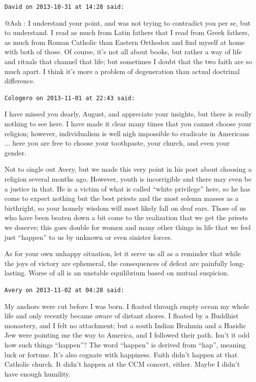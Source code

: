 \begin{footnotesize}
\begin{sffamily}
\hfill

\texttt{David on 2013-10-31 at 14:28 said:}

@Ash : I understand your point, and was not trying to contradict you per se, but to understand. I read as much from Latin fathers that I read from Greek fathers, as much from Roman Catholic than Eastern Orthodox and find myself at home with both of those. Of course, it's not all about books, but rather a way of life and rituals that channel that life; but sometimes I doubt that the two faith are so much apart. I think it's more a problem of degeneration than actual doctrinal difference.

\hfill

\texttt{Cologero on 2013-11-01 at 22:43 said:}

I have missed you dearly, August, and appreciate your insights, but there is really nothing to see here. I have made it clear many times that you cannot choose your religion; however, individualism is well nigh impossible to eradicate in Americans ... here you are free to choose your toothpaste, your church, and even your gender.

Not to single out Avery, but we made this very point in his post about choosing a religion several months ago. However, youth is incorrigible and there may even be a justice in that. He is a victim of what is called ``white privilege'' here, so he has come to expect nothing but the best priests and the most solemn masses as a birthright, so your homely wisdom will most likely fall on deaf ears. Those of us who have been beaten down a bit come to the realization that we get the priests we deserve; this goes double for women and many other things in life that we feel just ``happen'' to us by unknown or even sinister forces.

As for your own unhappy situation, let it serve us all as a reminder that while the joys of victory are ephemeral, the consequences of defeat are painfully long-lasting. Worse of all is an unstable equilibrium based on mutual suspicion.

\hfill

\texttt{Avery on 2013-11-02 at 04:28 said:}

My anchors were cut before I was born. I floated through empty ocean my whole life and only recently became aware of distant shores. I floated by a Buddhist monastery, and I felt no attachment; but a south Indian Brahmin and a Hasidic Jew were pointing me the way to America, and I followed their path. Isn't it odd how such things ``happen''? The word ``happen'' is derived from ``hap'', meaning luck or fortune. It's also cognate with happiness. Faith didn't happen at that Catholic church. It didn't happen at the CCM concert, either. Maybe I didn't have enough humility.


\end{sffamily}
\end{footnotesize}
